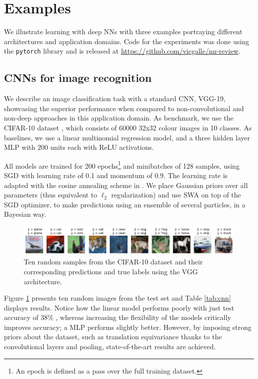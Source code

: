 \section{Examples}
We illustrate learning with deep NNs with three examples portraying
different architectures and application domains. Code for the experiments was done using the \texttt{pytorch} library \cite{torch} and is released at \url{https://github.com/vicgalle/nn-review}.

\subsection{CNNs for image recognition}\label{kkvision}

We describe an image classification task with a standard CNN, VGG-19, showcasing the superior performance when compared to non-convolutional and non-deep approaches in this application domain. As benchmark, we use the CIFAR-10 dataset \cite{krizhevsky2014cifar},
which consists of 60000 32x32 colour images in 10 classes. As baselines, we use a linear multinomial regression model, and a three hidden layer MLP with 200 units each with ReLU activations.

All models are trained for 200 epochs\footnote{An epoch is defined as a pass over the full training dataset.} and minibatches of 128 samples, using SGD with learning rate of 0.1 and  momentum of 0.9.
The learning rate is adapted with the cosine annealing scheme in  \cite{loshchilov2016sgdr}. We place Gaussian priors over all parameters (thus equivalent to $\ell_2$ regularization) and use SWA on top of the SGD optimizer, to make predictions using an ensemble of several particles, in a Bayesian way.

\begin{figure}[hbt]
\centering
  \includegraphics[width=1.\linewidth]{figures/cifar.png}
  \caption{Ten random samples from the CIFAR-10 dataset and their corresponding predictions and true labels using the VGG architecture.}
  \label{fig:cifar}
\end{figure}

Figure \ref{fig:cifar} presents ten random images from the test set
and Table \ref{tab:cnn} displays results. Notice how the linear model performs poorly with just test accuracy of 38\% , whereas increasing the flexibility of the models critically improves 
accuracy; a MLP performs slightly better.
However, by imposing strong priors about the dataset, such as translation equivariance thanks to the convolutional layers and pooling, state-of-the-art results are achieved.

